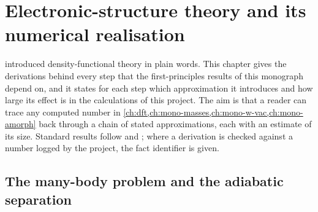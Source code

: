 \chapter{Electronic-structure theory and its numerical realisation}
\label{ch:mono-dft-theory}

 introduced density-functional theory in plain words. This chapter gives the derivations behind
every step that the first-principles results of this monograph depend on, and it states for each step which
approximation it introduces and how large its effect is in the calculations of this project. The aim is that a reader
can trace any computed number in \cref{ch:dft,ch:mono-masses,ch:mono-w-vac,ch:mono-amorph} back through a chain of
stated approximations, each with an estimate of its size. Standard results follow \citet{Martin2004} and
\citet{Payne1992}; where a derivation is checked against a number logged by the project, the fact identifier is given.

\section{The many-body problem and the adiabatic separation}
\label{sec:mono-dft-bo}

